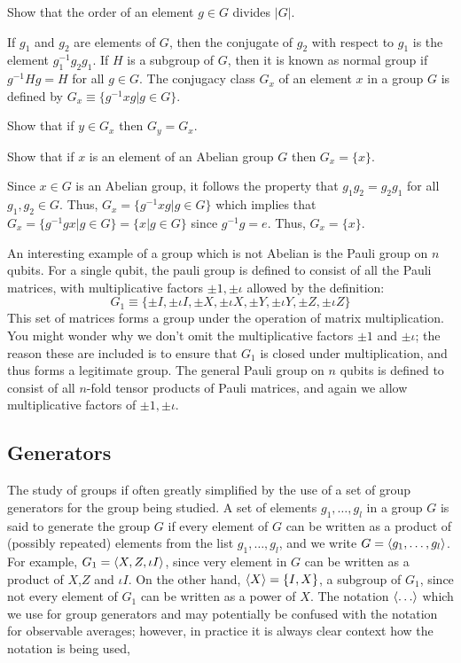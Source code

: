 \begin{example}
    Show that the order of an element $g\in G$ divides $|G|$.
\end{example}

If $g_1$ and $g_2$ are elements of $G$, then the conjugate of $g_2$ with respect to $g_1$ is the element $g_1^{-1}g_2g_1$. If $H$ is a subgroup of $G$, then it is known as normal group if $g^{-1}Hg=H$ for all $g \in G$. The conjugacy class $G_x$ of an element $x$ in a group $G$ is defined by $G_x \equiv \{g^{-1}xg|g\in G\}$.
\begin{example}
    Show that if $y\in G_x$ then $G_y=G_x$.
\end{example}
\begin{example}
    Show that if $x$ is an element of an Abelian group $G$ then $G_x=\{x\}$.

    Since $x\in G$ is an Abelian group, it follows the property that $g_1g_2=g_2g_1$ for all $g_1,g_2 \in G$. Thus, $G_x = \{g^{-1}xg|g\in G\}$ which implies that $G_x=\{g^{-1}gx|g\in G\} = \{x|g\in G\}$ since $g^{-1}g=e$. Thus, $G_x = \{x\}$.
\end{example}

An interesting example of a group which is not Abelian is the Pauli group on $n$ qubits. For a single qubit, the pauli group is defined to consist of all the Pauli matrices, with multiplicative factors $\pm 1,\pm \iota$ allowed by the definition:
\[
G_1 \equiv \{\pm I,\pm \iota I,\pm X, \pm \iota X,\pm Y,\pm \iota Y,\pm Z, \pm \iota Z\}
\]
This set of matrices forms a group under the operation of matrix multiplication. You might wonder why we don't omit the multiplicative factors $\pm 1$ and $\pm \iota$; the reason these are included is to ensure that $G_1$ is closed under multiplication, and thus forms a legitimate group. The general Pauli group on $n$ qubits is defined to consist of all $n$-fold tensor products of Pauli matrices, and again we allow multiplicative factors of $\pm 1, \pm \iota$.

\subsection{Generators}
The study of groups if often greatly simplified by the use of a set of group generators for the group being studied. A set of elements $g_1,\ldots,g_l$ in a group $G$ is said to generate the group $G$ if every element of $G$ can be written as a product of (possibly repeated) elements from the list $g_1,\ldots, g_l$, and we write $G=\braket{g_1,\ldots,g_l}$. For example, $G_1=\braket{X,Z,\iota I}$, since very element in $G$ can be written as a product of $X$,$Z$ and $\iota I$. On the other hand, $\braket{X}=\{I,X\}$, a subgroup of $G_1$, since not every element of $G_1$ can be written as a power of $X$.  The notation $\braket{\ldots}$ which we use for group generators and may potentially be confused with the notation for observable averages; however, in practice it is always clear context how the notation is being used,

